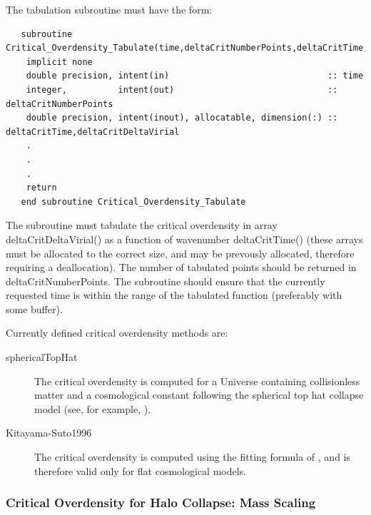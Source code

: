 The tabulation subroutine must have the form:
\begin{verbatim}
   subroutine Critical_Overdensity_Tabulate(time,deltaCritNumberPoints,deltaCritTime,deltaCritDeltaCrit)
    implicit none
    double precision, intent(in)                               :: time
    integer,          intent(out)                              :: deltaCritNumberPoints
    double precision, intent(inout), allocatable, dimension(:) :: deltaCritTime,deltaCritDeltaVirial
    .
    .
    .
    return
   end subroutine Critical_Overdensity_Tabulate
\end{verbatim}
The subroutine must tabulate the critical overdensity in array {\normalfont \ttfamily deltaCritDeltaVirial()} as a function of wavenumber {\normalfont \ttfamily deltaCritTime()} (these arrays must be allocated to the correct size, and may be prevously allocated, therefore requiring a deallocation). The number of tabulated points should be returned in {\normalfont \ttfamily deltaCritNumberPoints}. The subroutine should ensure that the currently requested {\normalfont \ttfamily time} is within the range of the tabulated function (preferably with some buffer).

Currently defined critical overdensity methods are:
\begin{description}
 \item [{\normalfont \ttfamily sphericalTopHat}] The critical overdensity is computed for a Universe containing collisionless matter and a cosmological constant following the spherical top hat collapse model (see, for example, \citealt{percival_cosmological_2005}).
 \item [{\normalfont \ttfamily Kitayama-Suto1996}] The critical overdensity is computed using the fitting formula of \cite{kitayama_semianalytic_1996}, and is therefore valid only for flat cosmological models.
\end{description}

\subsubsection{Critical Overdensity for Halo Collapse: Mass Scaling}

